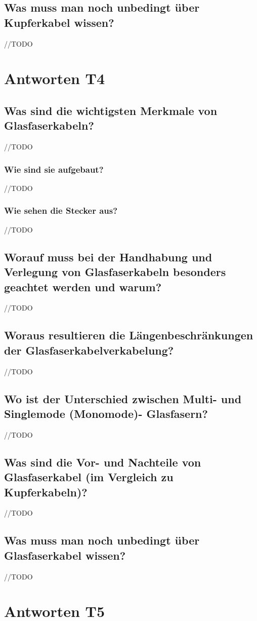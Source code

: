 \subsection*{Was muss man noch unbedingt über Kupferkabel wissen?}
//TODO

\section{Antworten T4}
\subsection*{Was sind die wichtigsten Merkmale von Glasfaserkabeln?}
//TODO
\subsubsection*{Wie sind sie aufgebaut?}
//TODO
\subsubsection*{Wie sehen die Stecker aus?}
//TODO
\subsection*{Worauf muss bei der Handhabung und Verlegung von Glasfaserkabeln besonders geachtet werden und warum?}
//TODO
\subsection*{Woraus resultieren die Längenbeschränkungen der Glasfaserkabelverkabelung?}
//TODO
\subsection*{Wo ist der Unterschied zwischen Multi- und Singlemode (Monomode)- Glasfasern?}
//TODO
\subsection*{Was sind die Vor- und Nachteile von Glasfaserkabel (im Vergleich zu Kupferkabeln)?}
//TODO
\subsection*{Was muss man noch unbedingt über Glasfaserkabel wissen?}
//TODO

\section{Antworten T5}
